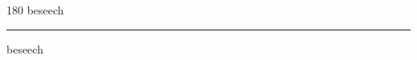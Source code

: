 
\begin{frame}
\begin{center}
\begin{turn}{180}
{\fontsize{2.5cm}{1em}\selectfont beseech}
\end{turn}
\vspace{1em}\par  
\hrule
\vspace{1em}\par  
{\fontsize{2.5cm}{1em}\selectfont beseech}
\end{center}
\end{frame}
